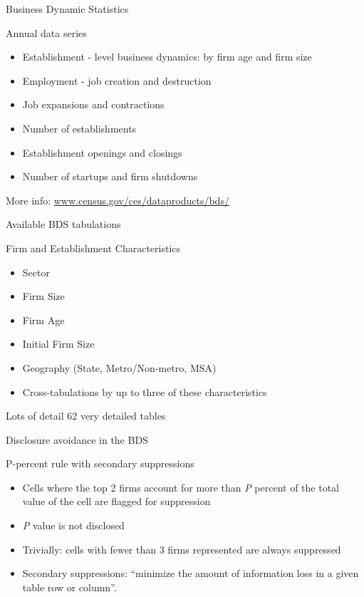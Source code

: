 \begin{frame}{Business Dynamic Statistics}
\begin{block}{Annual data series}
\begin{itemize}
\item Establishment - level business dynamics: by firm age and firm size
\item Employment - job creation and destruction
\item Job expansions and contractions
\item Number of establishments
\item Establishment openings and closings
\item Number of startups and firm shutdowns   
\end{itemize}
\end{block}
More info: \href{http://www.census.gov/ces/dataproducts/bds/}{www.census.gov/ces/dataproducts/bds/}
\end{frame}

\begin{frame}{Available BDS tabulations}
\begin{block}{Firm and Establishment Characteristics}
\begin{itemize}
\item Sector
\item Firm Size
\item Firm Age
\item Initial Firm Size
\item Geography (State, Metro/Non-metro, MSA)
\item Cross-tabulations by up to three of these characteristics
\end{itemize}
\end{block}
\begin{block}{Lots of detail}
62 very detailed tables
\end{block}
\end{frame}

\begin{frame}{Disclosure avoidance in the BDS}
\begin{block}{P-percent rule with secondary suppressions}
\begin{itemize}[<+->]
\item Cells where the top 2 firms account for more than \emph{P} percent of the total value of the cell are flagged for suppression
\item \emph{P} value is not disclosed
\item Trivially: cells with fewer than 3 firms represented are always suppressed
\item Secondary suppressions: ``minimize the amount of information loss in a given table row or column''.
\end{itemize}
\end{block}
\end{frame}


